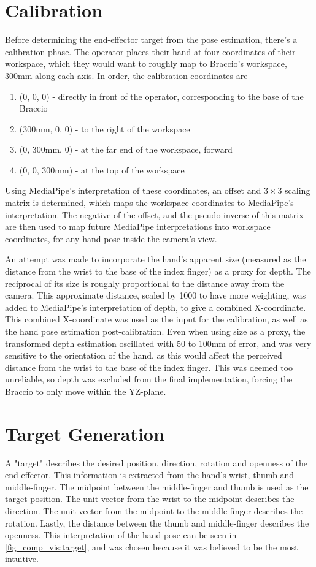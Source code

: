 \newpage
\section{Calibration}
Before determining the end-effector target from the pose estimation, there's a calibration phase. The operator places their hand at four coordinates of their workspace, which they would want to roughly map to Braccio's workspace, 300mm along each axis. In order, the calibration coordinates are
\begin{enumerate}[nosep]
    \item (0, 0, 0) - directly in front of the operator, corresponding to the base of the Braccio
    \item (300mm, 0, 0) - to the right of the workspace
    \item (0, 300mm, 0) - at the far end of the workspace, forward
    \item (0, 0, 300mm) - at the top of the workspace
\end{enumerate}

Using MediaPipe's interpretation of these coordinates, an offset and $3\times3$ scaling matrix is determined, which maps the workspace coordinates to MediaPipe's interpretation. The negative of the offset, and the pseudo-inverse of this matrix are then used to map future MediaPipe interpretations into workspace coordinates, for any hand pose inside the camera's view.

An attempt was made to incorporate the hand's apparent size (measured as the distance from the wrist to the base of the index finger) as a proxy for depth. The reciprocal of its size is roughly proportional to the distance away from the camera. This approximate distance, scaled by 1000 to have more weighting, was added to MediaPipe's interpretation of depth, to give a combined X-coordinate. This combined X-coordinate was used as the input for the calibration, as well as the hand pose estimation post-calibration. Even when using size as a proxy, the transformed depth estimation oscillated with 50 to 100mm of error, and was very sensitive to the orientation of the hand, as this would affect the perceived distance from the wrist to the base of the index finger. This was deemed too unreliable, so depth was excluded from the final implementation, forcing the Braccio to only move within the YZ-plane.

\section{Target Generation}\label{sec_comp_vis:target_generation}
A "target" describes the desired position, direction, rotation and openness of the end effector. This information is extracted from the hand's wrist, thumb and middle-finger. The midpoint between the middle-finger and thumb is used as the target position. The unit vector from the wrist to the midpoint describes the direction. The unit vector from the midpoint to the middle-finger describes the rotation. Lastly, the distance between the thumb and middle-finger describes the openness. This interpretation of the hand pose can be seen in \autoref{fig_comp_vis:target}, and was chosen because it was believed to be the most intuitive.

